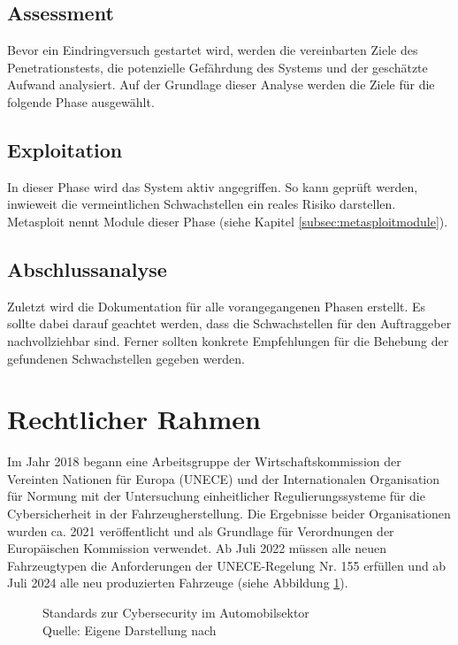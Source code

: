 \subsection{Assessment}\label{subsec:risikoanalyse}

Bevor ein Eindringversuch gestartet wird, werden die vereinbarten Ziele des Penetrationstests, die potenzielle Gefährdung des Systems und der geschätzte Aufwand analysiert. Auf der Grundlage dieser Analyse werden die Ziele für die folgende Phase ausgewählt. 

\subsection{Exploitation}\label{subsec:eindringversuch}

In dieser Phase wird das System aktiv angegriffen. So kann geprüft werden, inwieweit die vermeintlichen Schwachstellen ein reales Risiko darstellen. Metasploit nennt Module dieser Phase  (siehe Kapitel \ref{subsec:metasploitmodule}).

\subsection{Abschlussanalyse}\label{subsec:eindringversuch}

Zuletzt wird die Dokumentation für alle vorangegangenen Phasen erstellt. Es sollte dabei darauf geachtet werden, dass die Schwachstellen für den Auftraggeber nachvollziehbar sind. Ferner sollten konkrete Empfehlungen für die Behebung der gefundenen Schwachstellen gegeben werden.

\section{Rechtlicher Rahmen}\label{sec:automotivepentesting}

Im Jahr 2018 begann eine Arbeitsgruppe der Wirtschaftskommission der Vereinten Nationen für Europa (UNECE) und der Internationalen Organisation für Normung mit der Untersuchung einheitlicher Regulierungssysteme für die Cybersicherheit in der Fahrzeugherstellung. Die Ergebnisse beider Organisationen wurden ca. 2021 veröffentlicht und als Grundlage für Verordnungen der Europäischen Kommission verwendet. Ab Juli 2022 müssen alle neuen Fahrzeugtypen die Anforderungen der UNECE-Regelung Nr. 155 erfüllen und ab Juli 2024 alle neu produzierten Fahrzeuge (siehe Abbildung \ref{fig:regulierungen}).

\begin{figure}[H]
	\centering
	
	\caption{Standards zur Cybersecurity im Automobilsektor \\ Quelle: Eigene Darstellung nach \cite[]{Ebert2021}}
	\label{fig:regulierungen}
\end{figure}

